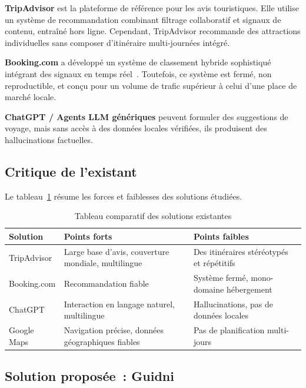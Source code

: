 \textbf{TripAdvisor} est la plateforme de référence pour les avis touristiques. Elle utilise
un système de recommandation combinant filtrage collaboratif et signaux de contenu, entraîné
hors ligne. Cependant, TripAdvisor recommande des attractions individuelles sans composer
d'itinéraire multi-journées intégré.

\textbf{Booking.com} a développé un système de classement hybride sophistiqué intégrant des
signaux en temps réel~\cite{bernardi2019booking}. Toutefois, ce système est fermé, non
reproductible, et conçu pour un volume de trafic supérieur à celui d'une place de marché locale.

\textbf{ChatGPT / Agents LLM génériques} peuvent formuler des suggestions de voyage, mais
sans accès à des données locales vérifiées, ils produisent des hallucinations factuelles.

\subsection{Critique de l'existant}

Le tableau~\ref{tab:critique_existant} résume les forces et faiblesses des solutions étudiées.

\begin{table}[H]
    \centering
    \caption{Tableau comparatif des solutions existantes}
    \label{tab:critique_existant}
    \small
    \begin{tabular}{p{2.5cm} p{4.5cm} p{4.5cm}}
        \toprule
        \textbf{Solution} & \textbf{Points forts} & \textbf{Points faibles} \\
        \midrule
        TripAdvisor &
        Large base d'avis, couverture mondiale, multilingue &
        Des itinéraires stéréotypés et répétitifs \\[6pt]
        Booking.com &
        Recommandation fiable &
        Système fermé, mono-domaine hébergement \\[6pt]
        ChatGPT &
        Interaction en langage naturel, multilingue &
        Hallucinations, pas de données locales \\[6pt]
        Google Maps &
        Navigation précise, données géographiques fiables &
        Pas de planification multi-jours \\
        \bottomrule
    \end{tabular}
\end{table}

\subsection{Solution proposée~: Guidni}

